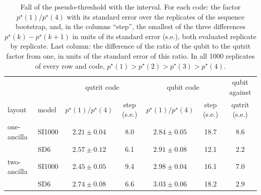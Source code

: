 \begin{table}[tp]
  \centering
  \small
  \begin{tabular}{ll|cc|cc|c}
    \hline
    & & \multicolumn{2}{c|}{qutrit code} & \multicolumn{2}{c|}{qubit code} & qubit against \\
    layout & model & $p^\star(1)/p^\star(4)$ & step (s.e.) & $p^\star(1)/p^\star(4)$ & step (s.e.) & qutrit (s.e.) \\
    \hline
    one-ancilla & SI1000 & $2.21 \pm 0.04$ & 8.0 & $2.84 \pm 0.05$ & 18.7 & 8.6 \\
     & SD6 & $2.57 \pm 0.12$ & 6.1 & $2.91 \pm 0.08$ & 12.1 & 2.2 \\
    two-ancilla & SI1000 & $2.45 \pm 0.05$ & 9.4 & $2.98 \pm 0.04$ & 16.1 & 7.0 \\
     & SD6 & $2.74 \pm 0.08$ & 6.6 & $3.03 \pm 0.06$ & 18.2 & 2.9 \\
    \hline
  \end{tabular}
  \caption{Fall of the pseudo-threshold with the interval. For each code: the factor $p^\star(1)/p^\star(4)$ with its standard error over the replicates of the sequence bootstrap, and, in the columns ``step'', the smallest of the three differences $p^\star(k) - p^\star(k+1)$ in units of its standard error (s.e.), both evaluated replicate by replicate. Last column: the difference of the ratio of the qubit to the qutrit factor from one, in units of the standard error of this ratio. In all 1000 replicates of every row and code, $p^\star(1) > p^\star(2) > p^\star(3) > p^\star(4)$.}
  \label{tab:fall_factors}
\end{table}

